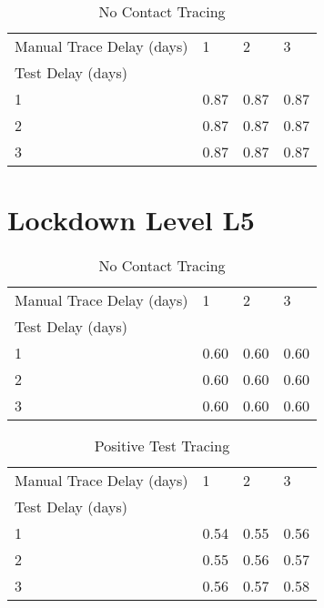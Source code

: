 \documentclass{article}
\begin{document}
    \begin{table}[H]
         \begin{tabular}{llll}
\toprule
Manual Trace Delay (days) &     1 &     2 &     3 \\
Test Delay (days) &       &       &       \\
\midrule
1                 &  0.87 &  0.87 &  0.87 \\
2                 &  0.87 &  0.87 &  0.87 \\
3                 &  0.87 &  0.87 &  0.87 \\
\bottomrule
\end{tabular}

        \caption{No Contact Tracing}
    \end{table}
    

\clearpage

\section{Lockdown Level L5}


    \begin{table}[H]
         \begin{tabular}{llll}
\toprule
Manual Trace Delay (days) &     1 &     2 &     3 \\
Test Delay (days) &       &       &       \\
\midrule
1                 &  0.60 &  0.60 &  0.60 \\
2                 &  0.60 &  0.60 &  0.60 \\
3                 &  0.60 &  0.60 &  0.60 \\
\bottomrule
\end{tabular}

        \caption{No Contact Tracing}
    \end{table}
    


    \begin{table}[H]
         \begin{tabular}{llll}
\toprule
Manual Trace Delay (days) &     1 &     2 &     3 \\
Test Delay (days) &       &       &       \\
\midrule
1                 &  0.54 &  0.55 &  0.56 \\
2                 &  0.55 &  0.56 &  0.57 \\
3                 &  0.56 &  0.57 &  0.58 \\
\bottomrule
\end{tabular}

        \caption{Positive Test Tracing}
    \end{table}
    
\end{document}
